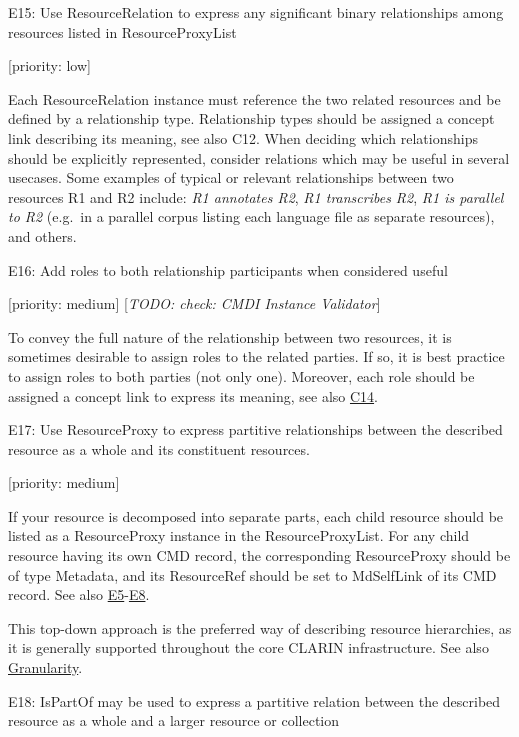 \documentclass[]{article}
\begin{document}
E15: Use ResourceRelation to express any significant binary
relationships among resources listed in ResourceProxyList

{[}priority: low{]}

Each ResourceRelation instance must reference the two related resources
and be defined by a relationship type. Relationship types should be
assigned a concept link describing its meaning, see also C12. When
deciding which relationships should be explicitly represented, consider
relations which may be useful in several usecases. Some examples of
typical or relevant relationships between two resources R1 and R2
include: \emph{R1 annotates R2}, \emph{R1 transcribes R2}, \emph{R1 is
parallel to R2} (e.g.~in a parallel corpus listing each language file as
separate resources), and others.

E16: Add roles to both relationship participants when considered useful

{[}priority: medium{]} {[}\emph{TODO: check: CMDI Instance Validator}{]}

To convey the full nature of the relationship between two resources, it
is sometimes desirable to assign roles to the related parties. If so, it
is best practice to assign roles to both parties (not only one).
Moreover, each role should be assigned a concept link to express its
meaning, see also
\href{/modelling_component_metadata/components.md\#c14}{C14}.

E17: Use ResourceProxy to express partitive relationships between the
described resource as a whole and its constituent resources.

{[}priority: medium{]}

If your resource is decomposed into separate parts, each child resource
should be listed as a ResourceProxy instance in the ResourceProxyList.
For any child resource having its own CMD record, the corresponding
ResourceProxy should be of type Metadata, and its ResourceRef should be
set to MdSelfLink of its CMD record. See also
\protect\hyperlink{e5-there-should-be-at-least-one-resource-proxy}{E5}-\protect\hyperlink{e8-metadata-type-resource-proxies-should-use-pids}{E8}.

This top-down approach is the preferred way of describing resource
hierarchies, as it is generally supported throughout the core CLARIN
infrastructure. See also
\href{/common_approachesproblems/granularity.md}{Granularity}.

E18: IsPartOf may be used to express a partitive relation between the
described resource as a whole and a larger resource or collection
\end{document}
